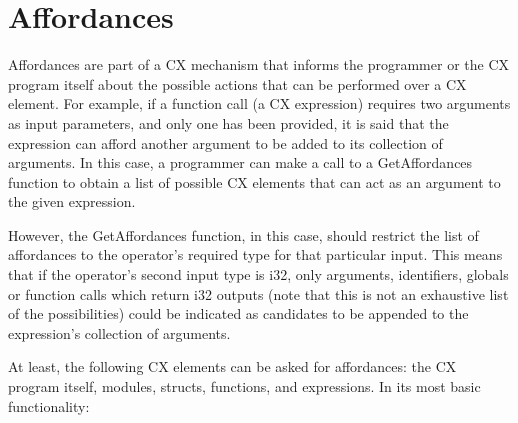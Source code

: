 \chapter{Affordances}
\label{affordances}

Affordances are part of a CX mechanism that informs the programmer or the CX
program itself about the possible actions that can be performed over a
CX element. For example, if a function call (a CX expression) requires
two arguments as input parameters, and only one has been provided, it
is said that the expression can afford another argument to be added to
its collection of arguments. In this case, a programmer can make a
call to a GetAffordances function to obtain a list of possible CX
elements that can act as an argument to the given expression.

However, the GetAffordances function, in this case, should restrict
the list of affordances to the operator's required type for that
particular input. This means that if the operator's second input type
is i32, only arguments, identifiers, globals or function calls which
return i32 outputs (note that this is not an exhaustive list of the
possibilities) could be indicated as candidates to be appended to the
expression's collection of arguments.

At least, the following CX elements can be asked for affordances: the CX program
itself, modules, structs, functions, and expressions. In its most
basic functionality:

